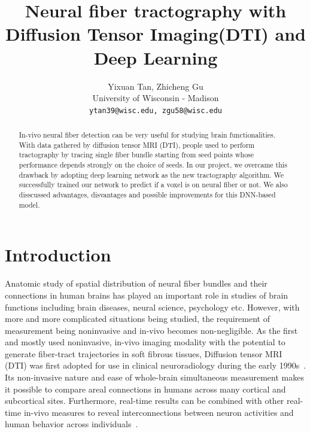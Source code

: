 \documentclass[10pt,twocolumn,letterpaper]{article}
\begin{document}
	
	\title{Neural fiber tractography with Diffusion Tensor Imaging(DTI) and Deep Learning}
	
	\author{Yixuan Tan, Zhicheng Gu\\
		University of Wisconsin - Madison\\
		{\tt\small ytan39@wisc.edu, zgu58@wisc.edu}
	}
	
	\maketitle
	
	\begin{abstract}
		In-vivo neural fiber detection can be very useful for studying brain functionalities. With data gathered by diffusion tensor MRI (DTI), people used to perform tractography by tracing single fiber bundle starting from seed points whose performance depends strongly on the choice of seeds. In our project, we overcame this drawback by adopting deep learning network as the new tractography algorithm. We successfully trained our network to predict if a voxel is on neural fiber or not. We also disscussed advantages, disvantages and possible improvements for this DNN-based model.
	\end{abstract}
	
	\section{Introduction}
	
	Anatomic study of spatial distribution of neural fiber bundles and their connections in human brains has played an important role in studies of brain functions including brain diseases, neural science, psychology etc. However, with more and more complicated situations being studied, the requirement of measurement being noninvasive and in-vivo becomes non-negligible. As the first and mostly used noninvasive, in-vivo imaging modality with the potential to generate fiber-tract trajectories in soft fibrous tissues, Diffusion tensor MRI (DTI) was first adopted for use in clinical neuroradiology during the early 1990s~\cite{mukherjee2008diffusion}. Its non-invasive nature and ease of whole-brain simultaneous measurement makes it possible to compare areal connections in humans across many cortical and subcortical sites. Furthermore, real-time results can be combined with other real-time in-vivo measures to reveal interconnections between neuron activities and human behavior across individuals~\cite{humanconnectblog}.
	
\end{document}
